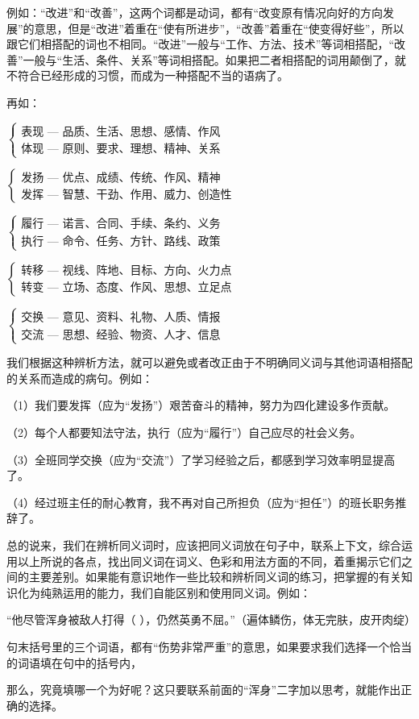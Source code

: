 例如：“改进”和“改善”，这两个词都是动词，都有“改变原有情况向好的方向发展”的意思，但是“改进”着重在“使有所进步”，“改善”着重在“使变得好些”，所以跟它们相搭配的词也不相同。“改进”一般与“工作、方法、技术”等词相搭配，“改善”一般与“生活、条件、关系”等词相搭配。如果把二者相搭配的词用颠倒了，就不符合已经形成的习惯，而成为一种搭配不当的语病了。

再如：

$\begin{cases}
    \text{表现 --- 品质、生活、思想、感情、作风}\\
    \text{体现 --- 原则、要求、理想、精神、关系}
\end{cases}$

$\begin{cases}
    \text{发扬 --- 优点、成绩、传统、作风、精神}\\
    \text{发挥 --- 智慧、干劲、作用、威力、创造性}
\end{cases}$

$\begin{cases}
    \text{履行 --- 诺言、合同、手续、条约、义务}\\
    \text{执行 --- 命令、任务、方针、路线、政策}
\end{cases}$

$\begin{cases}
    \text{转移 --- 视线、阵地、目标、方向、火力点}\\
    \text{转变 --- 立场、态度、作风、思想、立足点}
\end{cases}$

$\begin{cases}
    \text{交换 --- 意见、资料、礼物、人质、情报}\\
    \text{交流 --- 思想、经验、物资、人才、信息}
\end{cases}$

我们根据这种辨析方法，就可以避免或者改正由于不明确同义词与其他词语相搭配的关系而造成的病句。例如：

（1）我们要发挥（应为“发扬”）艰苦奋斗的精神，努力为四化建设多作贡献。

（2）每个人都要知法守法，执行（应为“履行”）自己应尽的社会义务。

（3）全班同学交换（应为“交流”）了学习经验之后，都感到学习效率明显提高了。

（4）经过班主任的耐心教育，我不再对自己所担负（应为“担任”）的班长职务推辞了。

总的说来，我们在辨析同义词时，应该把同义词放在句子中，联系上下文，综合运用以上所说的各点，找出同义词在词义、色彩和用法方面的不同，着重揭示它们之间的主要差别。如果能有意识地作一些比较和辨析同义词的练习，把掌握的有关知识化为纯熟运用的能力，我们自能区别和使用同义词。例如：

“他尽管浑身被敌人打得（ ），仍然英勇不屈。”（遍体鳞伤，体无完肤，皮开肉绽）

句末括号里的三个词语，都有“伤势非常严重”的意思，如果要求我们选择一个恰当的词语填在句中的括号内，

那么，究竟填哪一个为好呢？这只要联系前面的“浑身”二字加以思考，就能作出正确的选择。
\newpage